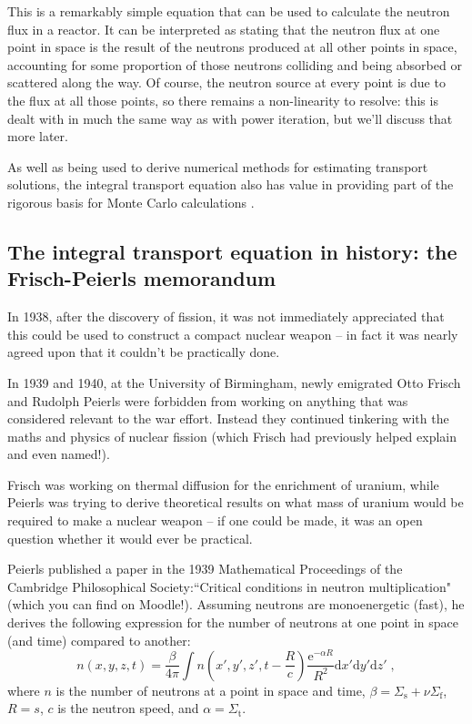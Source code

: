 \documentclass{article}
\begin{document}
This is a remarkably simple equation that can be used to calculate the neutron flux in a reactor. It can be interpreted as stating that the neutron flux at one point in space is the result of the neutrons produced at all other points in space, accounting for some proportion of those neutrons colliding and being absorbed or scattered along the way. Of course, the neutron source at every point is due to the flux at all those points, so there remains a non-linearity to resolve: this is dealt with in much the same way as with power iteration, but we'll discuss that more later.

As well as being used to derive numerical methods for estimating transport solutions, the integral transport equation also has value in providing part of the rigorous basis for Monte Carlo calculations \cite{Lux}. 

\subsection{The integral transport equation in history: the Frisch-Peierls memorandum}

In 1938, after the discovery of fission, it was not immediately appreciated that this could be used to construct a compact nuclear weapon -- in fact it was nearly agreed upon that it couldn't be practically done.

In 1939 and 1940, at the University of Birmingham, newly emigrated Otto Frisch and Rudolph Peierls were forbidden from working on anything that was considered relevant to the war effort. Instead they continued tinkering with the maths and physics of nuclear fission (which Frisch had previously helped explain and even named!).

Frisch was working on thermal diffusion for the enrichment of uranium, while Peierls was trying to derive theoretical results on what mass of uranium would be required to make a nuclear weapon -- if one could be made, it was an open question whether it would ever be practical.

Peierls published a paper in the 1939 Mathematical Proceedings of the Cambridge Philosophical Society:``Critical conditions in neutron multiplication" (which you can find on Moodle!). Assuming neutrons are monoenergetic (fast), he derives the following expression for the number of neutrons at one point in space (and time) compared to another:
\begin{equation}
    n(x,y,z,t) = \frac{\beta}{4\pi}\int n\left(x',y',z',t-\frac{R}{c}\right)\frac{\mathrm{e}^{-\alpha R}}{R^2}\mathrm{d}x'\mathrm{d}y'\mathrm{d}z'\;\mathrm{,}
\end{equation}
where $n$ is the number of neutrons at a point in space and time, $\beta = \Sigma_\mathrm{s}+\nu\Sigma_\mathrm{f}$, $R = s$, $c$ is the neutron speed, and $\alpha=\Sigma_\mathrm{t}$.
\end{document}
